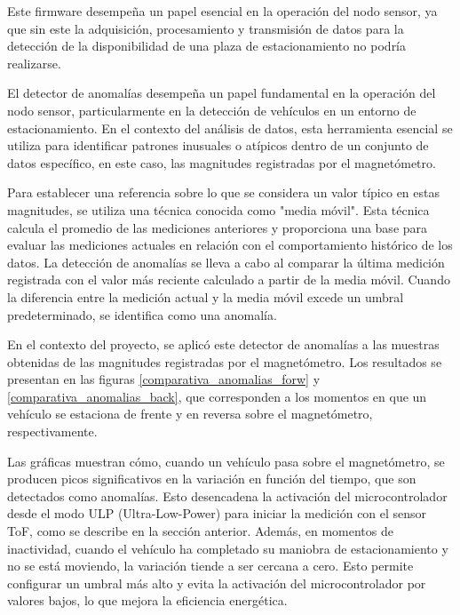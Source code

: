 Este firmware desempeña un papel esencial en la operación del nodo sensor, ya que sin este la adquisición, procesamiento y transmisión de datos para la detección de la disponibilidad de una plaza de estacionamiento no podría realizarse.


\label{detector_anomalias}
El detector de anomalías desempeña un papel fundamental en la operación del nodo sensor, particularmente en la detección de vehículos en un entorno de estacionamiento. En el contexto del análisis de datos, esta herramienta esencial se utiliza para identificar patrones inusuales o atípicos dentro de un conjunto de datos específico, en este caso, las magnitudes registradas por el magnetómetro.

Para establecer una referencia sobre lo que se considera un valor típico en estas magnitudes, se utiliza una técnica conocida como "media móvil". Esta técnica calcula el promedio de las mediciones anteriores y proporciona una base para evaluar las mediciones actuales en relación con el comportamiento histórico de los datos. La detección de anomalías se lleva a cabo al comparar la última medición registrada con el valor más reciente calculado a partir de la media móvil. Cuando la diferencia entre la medición actual y la media móvil excede un umbral predeterminado, se identifica como una anomalía.

En el contexto del proyecto, se aplicó este detector de anomalías a las muestras obtenidas de las magnitudes registradas por el magnetómetro. Los resultados se presentan en las figuras \ref{comparativa_anomalias_forw} y \ref{comparativa_anomalias_back}, que corresponden a los momentos en que un vehículo se estaciona de frente y en reversa sobre el magnetómetro, respectivamente.


Las gráficas muestran cómo, cuando un vehículo pasa sobre el magnetómetro, se producen picos significativos en la variación en función del tiempo, que son detectados como anomalías. Esto desencadena la activación del microcontrolador desde el modo ULP (Ultra-Low-Power) para iniciar la medición con el sensor ToF, como se describe en la sección anterior. Además, en momentos de inactividad, cuando el vehículo ha completado su maniobra de estacionamiento y no se está moviendo, la variación tiende a ser cercana a cero. Esto permite configurar un umbral más alto y evita la activación del microcontrolador por valores bajos, lo que mejora la eficiencia energética.

